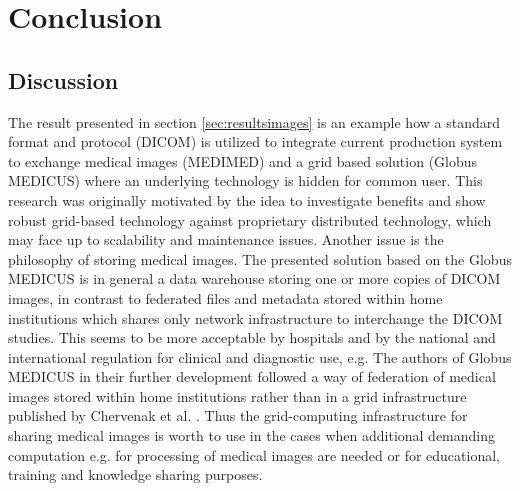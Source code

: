 \chapter{Conclusion}
\label{sec:conclusion}

\section{Discussion}



The result presented in section \ref{sec:resultsimages} is an example how a standard format and protocol (DICOM) is utilized to integrate current production system to exchange medical images (MEDIMED) and a grid based solution (Globus MEDICUS) where an underlying technology is hidden for common user. This research was originally motivated by the idea to investigate benefits and show robust grid-based technology against proprietary distributed technology, which may face up to scalability and maintenance issues. Another issue is the philosophy of storing medical images. The presented solution based on the Globus MEDICUS is in general a data warehouse storing one or more copies of DICOM images, in contrast to federated files and metadata stored within home institutions which shares only network infrastructure to interchange the DICOM studies. This seems to be more acceptable by hospitals and by the national and international regulation for clinical and diagnostic use, e.g. The authors of Globus MEDICUS in their further development followed a way of federation of medical images stored within home institutions rather than in a grid infrastructure published by Chervenak et al. \cite{Chervenak2012}. 
Thus the grid-computing infrastructure for sharing medical images is worth to use in the cases when additional demanding computation e.g. for processing of medical images are needed or for educational, training and knowledge sharing purposes.

